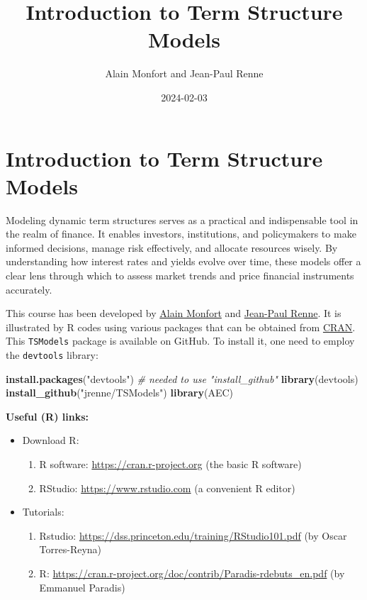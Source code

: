 \documentclass[
  12pt,
]{book}
\title{Introduction to Term Structure Models}
\author{Alain Monfort and Jean-Paul Renne}
\date{2024-02-03}
\newenvironment{Shaded}{\begin{snugshade}}{\end{snugshade}}
\newcommand{\CommentTok}[1]{\textcolor[rgb]{0.56,0.35,0.01}{\textit{#1}}}
\newcommand{\FunctionTok}[1]{\textcolor[rgb]{0.13,0.29,0.53}{\textbf{#1}}}
\newcommand{\NormalTok}[1]{#1}
\newcommand{\StringTok}[1]{\textcolor[rgb]{0.31,0.60,0.02}{#1}}
\providecommand{\tightlist}{%
  \setlength{\itemsep}{0pt}\setlength{\parskip}{0pt}}
\theoremstyle{definition}
\theoremstyle{definition}
\theoremstyle{definition}
\theoremstyle{definition}
\theoremstyle{remark}
\begin{document}
\maketitle

{
\setcounter{tocdepth}{1}
\tableofcontents
}
\newcommand{\bv}[1]{\mathbf{#1}}

\hypertarget{intro}{%
\chapter*{Introduction to Term Structure Models}\label{intro}}

Modeling dynamic term structures serves as a practical and indispensable tool in the realm of finance. It enables investors, institutions, and policymakers to make informed decisions, manage risk effectively, and allocate resources wisely. By understanding how interest rates and yields evolve over time, these models offer a clear lens through which to assess market trends and price financial instruments accurately.

This course has been developed by \href{https://faculty.crest.fr/amonfort/}{Alain Monfort} and \href{https://sites.google.com/site/jeanpaulrenne/home}{Jean-Paul Renne}. It is illustrated by R codes using various packages that can be obtained from \href{https://cran.r-project.org}{CRAN}. This \texttt{TSModels} package is available on GitHub. To install it, one need to employ the \texttt{devtools} library:

\begin{Shaded}
\begin{Highlighting}[]
\FunctionTok{install.packages}\NormalTok{(}\StringTok{"devtools"}\NormalTok{) }\CommentTok{\# needed to use "install\_github"}
\FunctionTok{library}\NormalTok{(devtools)}
\FunctionTok{install\_github}\NormalTok{(}\StringTok{"jrenne/TSModels"}\NormalTok{)}
\FunctionTok{library}\NormalTok{(AEC)}
\end{Highlighting}
\end{Shaded}

\textbf{Useful (R) links:}

\begin{itemize}
\item
  Download R:

  \begin{enumerate}
  \def\labelenumi{\alph{enumi}.}
  \tightlist
  \item
    R software: \url{https://cran.r-project.org} (the basic R software)
  \item
    RStudio: \url{https://www.rstudio.com} (a convenient R editor)
  \end{enumerate}
\item
  Tutorials:

  \begin{enumerate}
  \def\labelenumi{\alph{enumi}.}
  \tightlist
  \item
    Rstudio: \url{https://dss.princeton.edu/training/RStudio101.pdf} (by Oscar Torres-Reyna)
  \item
    R: \url{https://cran.r-project.org/doc/contrib/Paradis-rdebuts_en.pdf} (by Emmanuel Paradis)
  \end{enumerate}
\end{itemize}
\end{document}
